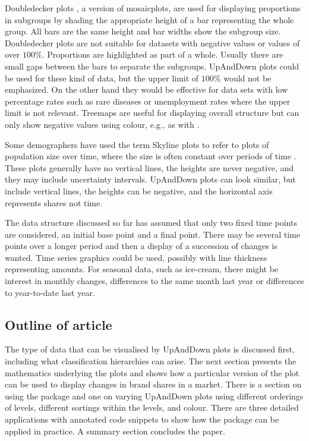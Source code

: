 Doubledecker plots \citep{hofmann:2008}, a version of mosaicplots, are used for displaying proportions in subgroups by shading the appropriate height of a bar representing the whole group. All bars are the same height and bar widths show the subgroup size. Doubledecker plots are not suitable for datasets with negative values or values of over \(100\%\). Proportions are highlighted as part of a whole. Usually there are small gaps between the bars to separate the subgroups. UpAndDown plots could be used for these kind of data, but the upper limit of \(100\%\) would not be emphasized. On the other hand they would be effective for data sets with low percentage rates such as rare diseases or unemployment rates where the upper limit is not relevant. Treemaps are useful for displaying overall structure but can only show negative values using colour, e.g., as with  \citep{tennekes:2023}.

Some demographers have used the term Skyline plots to refer to plots of population size over time, where the size is often constant over periods of time \citep{pybus:2000}. These plots generally have no vertical lines, the heights are never negative, and they may include uncertainty intervals. UpAndDown plots can look similar, but include vertical lines, the heights can be negative, and the horizontal axis represents shares not time.

The data structure discussed so far has assumed that only two fixed time points are considered, an initial base point and a final point. There may be several time points over a longer period and then a display of a succession of changes is wanted. Time series graphics could be used, possibly with line thickness representing amounts. For seasonal data, such as ice-cream, there might be interest in monthly changes, differences to the same month last year or differences to year-to-date last year.

\hypertarget{outline-of-article}{%
\subsection{Outline of article}\label{outline-of-article}}

The type of data that can be visualised by UpAndDown plots is discussed first, including what classification hierarchies can arise. The next section presents the mathematics underlying the plots and shows how a particular version of the plot can be used to display changes in brand shares in a market. There is a section on using the package and one on varying UpAndDown plots using different orderings of levels, different sortings within the levels, and colour. There are three detailed applications with annotated code snippets to show how the package can be applied in practice. A summary section concludes the paper.

